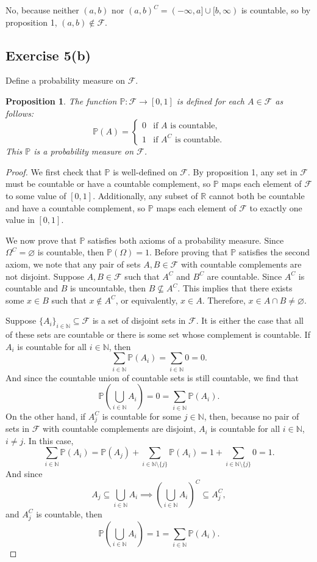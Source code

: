 \documentclass[12pt]{article}
\newtheorem{proposition}{Proposition}
\newenvironment{problem}
    {\begin{lrbox}{\mybox}\begin{minipage}{\textwidth-10pt}}
    {\end{minipage}\end{lrbox}\framebox[\textwidth]{\usebox{\mybox}}}
\newcommand{\N}{\mathbb{N}}
\newcommand{\R}{\mathbb{R}}
\let\emptyset\varnothing
\newcommand{\FF}{\mathcal{F}}
\renewcommand{\P}{\mathbb{P}}
\begin{document}
No, because neither $(a,b)$ nor $(a,b)^C = (-\infty,a]\cup[b,\infty)$ is countable, so by proposition 1, $(a,b)\notin\FF$.

\subsection*{Exercise 5(b)}
\begin{problem}
    Define a probability measure on $\FF$.
\end{problem}
\medskip

\begin{proposition}
    The function $\P:\FF\to[0,1]$ is defined for each $A\in\FF$ as follows:
    \[\P(A) = 
        \begin{cases}
            0 &\text{if $A$ is countable,} \\
            1 &\text{if $A^C$ is countable.}
        \end{cases}
    \]
    This $\P$ is a probability measure on $\FF$.
\end{proposition}

\begin{proof}
    We first check that $\P$ is well-defined on $\FF$. By proposition 1, any set in $\FF$ must be countable or have a countable complement, so $\P$ maps each element of $\FF$ to some value of $[0,1]$. Additionally, any subset of $\R$ cannot both be countable and have a countable complement, so $\P$ maps each element of $\FF$ to exactly one value in $[0,1]$.
    
    We now prove that $\P$ satisfies both axioms of a probability measure. Since $\Omega^C = \emptyset$ is countable, then $\P(\Omega) = 1$. Before proving that $\P$ satisfies the second axiom, we note that any pair of sets $A,B\in\FF$ with countable complements are not disjoint. Suppose $A,B\in\FF$ such that $A^C$ and $B^C$ are countable. Since $A^C$ is countable and $B$ is uncountable, then $B\not\subseteq A^C$. This implies that there exists some $x\in B$ such that $x\notin A^C$, or equivalently, $x\in A$. Therefore, $x\in A\cap B \ne \emptyset$.
    
    Suppose $\{A_i\}_{i\in\N} \subseteq \FF$ is a set of disjoint sets in $\FF$. It is either the case that all of these sets are countable or there is some set whose complement is countable. If $A_i$ is countable for all $i\in\N$, then
    \[\sum_{i\in\N}\P(A_i) = \sum_{i\in\N}0 = 0.\]
    And since the countable union of countable sets is still countable, we find that
    \[\P\left(\bigcup_{i\in\N}A_i\right) = 0 = \sum_{i\in\N}\P(A_i).\]
    On the other hand, if $A_j^C$ is countable for some $j\in\N$, then, because no pair of sets in $\FF$ with countable complements are disjoint, $A_i$ is countable for all $i\in\N$, $i\ne j$. In this case,
    \[\sum_{i\in\N}\P(A_i) = \P(A_j) + \sum_{i\in\N\setminus\{j\}}\P(A_i) = 1 + \sum_{i\in\N\setminus\{j\}}0 = 1.\]
    And since
    \[A_j \subseteq \bigcup_{i\in\N}A_i \implies \left(\bigcup_{i\in\N}A_i\right)^C \subseteq A_j^C,\]
    and $A_j^C$ is countable, then
    \[\P\left(\bigcup_{i\in\N}A_i\right) = 1 = \sum_{i\in\N}\P(A_i).\]
    
    
\end{proof}
\end{document}
